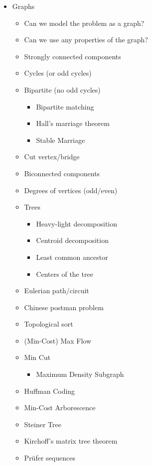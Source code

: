 \documentclass[9pt,a4paper,landscape,oneside]{amsart}
\newenvironment{myitemize}
{\begin{itemize}[leftmargin=.3cm]
	\setlength{\itemsep}{0pt}
	\setlength{\parskip}{0pt}
	\setlength{\parsep}{0pt}     }
{ \end{itemize}                  }
\begin{document}
\begin{multicols*}{3}
\begin{myitemize}
\begin{myitemize}
			\item Inclusion-exclusion principle
			\item Generating functions
		\end{myitemize}
	\item Graphs
		\begin{myitemize}
			\item Can we model the problem as a graph?
			\item Can we use any properties of the graph?
			\item Strongly connected components
			\item Cycles (or odd cycles)
			\item Bipartite (no odd cycles)
				\begin{myitemize}
					\item Bipartite matching
					\item Hall's marriage theorem
					\item Stable Marriage
				\end{myitemize}
			\item Cut vertex/bridge
			\item Biconnected components
			\item Degrees of vertices (odd/even)
			\item Trees
				\begin{myitemize}
					\item Heavy-light decomposition
					\item Centroid decomposition
					\item Least common ancestor
					\item Centers of the tree
				\end{myitemize}
			\item Eulerian path/circuit
			\item Chinese postman problem
			\item Topological sort
			\item (Min-Cost) Max Flow
			\item Min Cut
				\begin{myitemize}
					\item Maximum Density Subgraph
				\end{myitemize}
			\item Huffman Coding
			\item Min-Cost Arborescence
			\item Steiner Tree
			\item Kirchoff's matrix tree theorem
			\item Pr\"ufer sequences

\end{myitemize}
\end{myitemize}
\end{multicols*}
\end{document}
